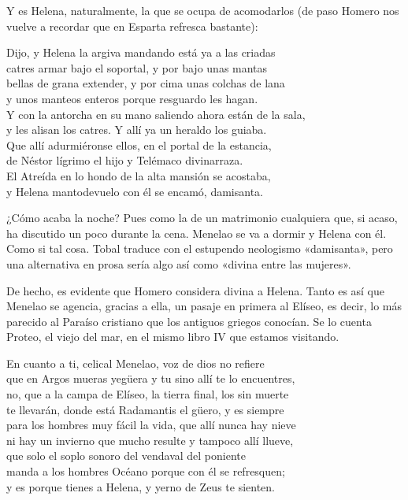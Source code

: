 Y es Helena, naturalmente, la que se ocupa de acomodarlos (de paso Homero nos vuelve a recordar que en Esparta refresca bastante):

\begin{versocita}
Dijo, y Helena la argiva mandando está ya a las criadas\\
catres armar bajo el soportal, y por bajo unas mantas\\
bellas de grana extender, y por cima unas colchas de lana\\
y unos manteos enteros porque resguardo les hagan.\\
Y con la antorcha en su mano saliendo ahora están de la sala,\\
y les alisan los catres. Y allí ya un heraldo los guiaba.\\
Que allí adurmiéronse ellos, en el portal de la estancia,\\
de Néstor lígrimo el hijo y Telémaco divinarraza.\\
El Atreída en lo hondo de la alta mansión se acostaba,\\
y Helena mantodevuelo con él se encamó, damisanta.
\end{versocita}

¿Cómo acaba la noche? Pues como la de un matrimonio cualquiera que, si acaso, ha discutido un poco durante la cena. Menelao se va a dormir y Helena con él. Como si tal cosa. Tobal traduce  con el estupendo neologismo «damisanta», pero una alternativa en prosa sería algo así como «divina entre las mujeres».

De hecho, es evidente que Homero considera divina a Helena. Tanto es así que Menelao se agencia, gracias a ella, un pasaje en primera al Elíseo, es decir, lo más parecido al Paraíso cristiano que los antiguos griegos conocían. Se lo cuenta Proteo, el viejo del mar, en el mismo libro IV que estamos visitando.


\begin{versocita}
En cuanto a ti, celical Menelao, voz de dios no refiere\\
que en Argos mueras yegüera y tu sino allí te lo encuentres,\\
no, que a la campa de Elíseo, la tierra final, los sin muerte\\
te llevarán, donde está Radamantis el güero, y es siempre\\
para los hombres muy fácil la vida, que allí nunca hay nieve\\
ni hay un invierno que mucho resulte y tampoco allí llueve,\\
que solo el soplo sonoro del vendaval del poniente\\
manda a los hombres Océano porque con él se refresquen;\\
y es porque tienes a Helena, y yerno de Zeus te sienten.
\end{versocita}

